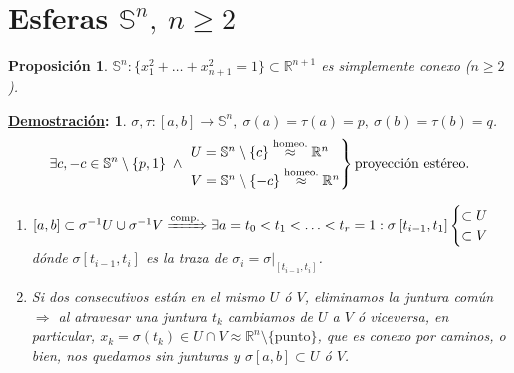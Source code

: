 \documentclass[10pt,a4paper,openright]{book}
\theoremstyle{break}
\newtheorem*{prop}{Proposición}
\newtheorem*{demo}{\underline{Demostración}:}
\begin{document}
\section{Esferas \texorpdfstring{$\mathbb{S}^n,\ n \ge 2$}{Sn, n >= 2}}%
\label{sec:esferas_s_n}
\begin{prop}
$\mathbb{S}^n : \{x_1^2 + \ldots + x_{n + 1}^2 = 1\} \subset \mathbb{R}^{n + 1}$ es simplemente conexo ($n \ge 2$).
\end{prop}
\begin{demo}
$\sigma, \tau: \left[ a, b \right] \rightarrow \mathbb{S}^n,\ \sigma\left( a \right) = \tau\left( a \right) = p,\ \sigma\left( b \right) = \tau\left( b \right) = q$.
\[
\exists c, -c \in \mathbb{S}^n\setminus \{p, 1\}\; \land \;\begin{rcases}
   U = \mathbb{S}^n \setminus \{c\} \stackrel{\text{homeo.}}{\approx} \mathbb{R}^n\\
   V = \mathbb{S}^n \setminus \{-c\} \stackrel{\text{homeo.}}{\approx} \mathbb{R}^n
\end{rcases} \text{proyección estéreo.}  
\]
\begin{enumerate}
    \item $\left[ a, b \right] \subset \sigma^{-1}U \cup \sigma^{-1}V \xRightarrow{\text{comp.}} \exists a = t_0 < t_1 < \ldots < t_r = 1: \sigma\left[ t_{i - 1}, t_1 \right] \begin{cases}
        \subset U\\
        \subset V
    \end{cases}$ dónde $\sigma\left[ t_{i - 1}, t_i \right]$ es la traza de $\sigma_i = \sigma|_{\left[ t_{i - 1}, t_i \right]}$.

    \item Si dos consecutivos están en el mismo $U$ ó $V$, eliminamos la juntura común $\Rightarrow$ al atravesar una juntura $t_k$ cambiamos de $U$ a $V$ ó viceversa, en particular, $x_k = \sigma\left( t_k \right) \in U \cap V \approx \mathbb{R}^n \setminus \{\text{punto}\}$, que es conexo por caminos, o bien, nos quedamos sin junturas y $\sigma\left[ a, b \right] \subset U$ ó $V$.


\end{enumerate}
\end{demo}
\end{document}
